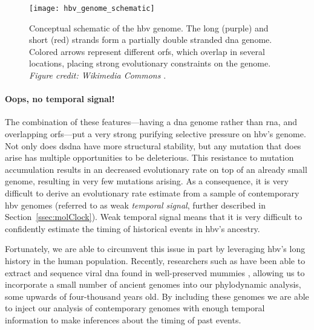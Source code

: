 \begin{figure}[ht]
  \centering
  \texttt{[image: hbv\_genome\_schematic]}
  \caption[Schematic of the hepatitis B virus genome]{Conceptual schematic of the \gls{hbv} genome. The long (purple) and short (red) strands form a partially double stranded \gls{dna} genome. Colored arrows represent different \gls{orf}s, which overlap in several locations, placing strong evolutionary constraints on the genome. \textit{Figure credit: Wikimedia Commons} \citep{commons2016file}.
  }
  \label{fig:hbvGenome}
\end{figure}

\paragraph*{Oops, no temporal signal!}
The combination of these features---having a \gls{dna} genome rather than \gls{rna}, and overlapping \gls{orf}s---put a very strong purifying selective pressure on \gls{hbv}'s genome.
Not only does ds\gls{dna} have more structural stability, but any mutation that does arise has multiple opportunities to be deleterious.
This resistance to mutation accumulation results in an decreased evolutionary rate on top of an already small genome, resulting in very few mutations arising.
As a consequence, it is very difficult to derive an evolutionary rate estimate from a sample of contemporary \gls{hbv} genomes (referred to as weak \textit{temporal signal}, further described in Section~\ref{ssec:molClock}).
Weak temporal signal means that it is very difficult to confidently estimate the timing of historical events in \gls{hbv}'s ancestry.

Fortunately, we are able to circumvent this issue in part by leveraging \gls{hbv}'s long history in the human population.
Recently, researchers such as \citet{muhlemann2018ancient} have been able to extract and sequence viral \gls{dna} found in well-preserved mummies \citep{muhlemann2018ancient,ross2018paradox}, allowing us to incorporate a small number of ancient genomes into our phylodynamic analysis, some upwards of four-thousand years old.
By including these genomes we are able to inject our analysis of contemporary genomes with enough temporal information to make inferences about the timing of past events.

